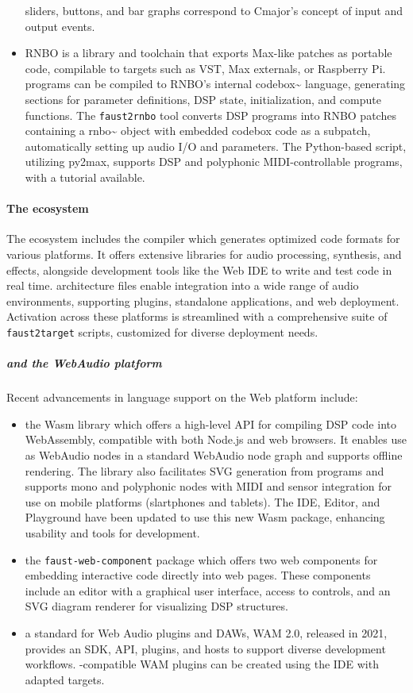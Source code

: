 \begin{itemize}
  sliders, buttons, and bar graphs correspond to Cmajor's concept of
  input and output events.
\item
  RNBO is a library and toolchain that exports Max-like patches as
  portable code, compilable to targets such as VST, Max externals, or
  Raspberry Pi. \F{} programs can be compiled to RNBO's internal
  codebox\textasciitilde{} language, generating sections for parameter
  definitions, DSP state, initialization, and compute functions. The
  \texttt{faust2rnbo} tool converts \F{} DSP programs into RNBO patches
  containing a rnbo\textasciitilde{} object with embedded codebox code
  as a subpatch, automatically setting up audio I/O and parameters. The
  Python-based script, utilizing py2max, supports DSP and polyphonic
  MIDI-controllable programs, with a tutorial available.
\end{itemize}


\paragraph{The \F{} ecosystem}

The \F{} ecosystem includes the compiler which generates optimized code
formats for various platforms. It offers extensive libraries for audio
processing, synthesis, and effects, alongside development tools like the
\F{} Web IDE to write and test code in real time. \F{} architecture
files enable integration into a wide range of audio environments,
supporting plugins, standalone applications, and web deployment.
Activation across these platforms is streamlined with a comprehensive
suite of \texttt{faust2target} scripts, customized for diverse
deployment needs.

\subparagraph{\F{} and the WebAudio platform}

Recent advancements in \F{} language support on the Web platform
include:

\begin{itemize}
\item
  the \F{}Wasm library which offers a high-level API for compiling
  \F{} DSP code into WebAssembly, compatible with both Node.js and web
  browsers. It enables use as WebAudio nodes in a standard WebAudio node
  graph and supports offline rendering. The library also facilitates SVG
  generation from \F{} programs and supports mono and polyphonic nodes
  with MIDI and sensor integration for use on mobile platforms
  (slartphones and tablets). The \F{} IDE, Editor, and Playground have
  been updated to use this new \F{}Wasm package, enhancing usability
  and tools for \F{} development.
\item
  the \texttt{faust-web-component} package which offers two web
  components for embedding interactive \F{} code directly into web
  pages. These components include an editor with a graphical user
  interface, access to controls, and an SVG diagram renderer for
  visualizing DSP structures.
\item
  a standard for Web Audio plugins and DAWs, WAM 2.0, released in 2021,
  provides an SDK, API, plugins, and hosts to support diverse
  development workflows. \F{}-compatible WAM plugins can be created
  using the \F{} IDE with adapted targets.
\end{itemize}

